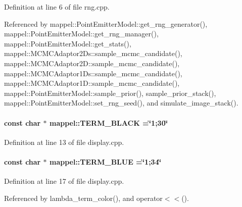 Definition at line 6 of file rng.\+cpp.



Referenced by mappel\+::\+Point\+Emitter\+Model\+::get\+\_\+rng\+\_\+generator(), mappel\+::\+Point\+Emitter\+Model\+::get\+\_\+rng\+\_\+manager(), mappel\+::\+Point\+Emitter\+Model\+::get\+\_\+stats(), mappel\+::\+M\+C\+M\+C\+Adaptor2\+Ds\+::sample\+\_\+mcmc\+\_\+candidate(), mappel\+::\+M\+C\+M\+C\+Adaptor2\+D\+::sample\+\_\+mcmc\+\_\+candidate(), mappel\+::\+M\+C\+M\+C\+Adaptor1\+Ds\+::sample\+\_\+mcmc\+\_\+candidate(), mappel\+::\+M\+C\+M\+C\+Adaptor1\+D\+::sample\+\_\+mcmc\+\_\+candidate(), mappel\+::\+Point\+Emitter\+Model\+::sample\+\_\+prior(), sample\+\_\+prior\+\_\+stack(), mappel\+::\+Point\+Emitter\+Model\+::set\+\_\+rng\+\_\+seed(), and simulate\+\_\+image\+\_\+stack().

\paragraph[{\texorpdfstring{T\+E\+R\+M\+\_\+\+B\+L\+A\+CK}{TERM_BLACK}}]{\setlength{\rightskip}{0pt plus 5cm}const char $\ast$ mappel\+::\+T\+E\+R\+M\+\_\+\+B\+L\+A\+CK =\char`\"{}1;30\char`\"{}}\hypertarget{namespacemappel_a448ca8ea08b3b9cdf522884ac004d901}{}\label{namespacemappel_a448ca8ea08b3b9cdf522884ac004d901}


Definition at line 13 of file display.\+cpp.

\paragraph[{\texorpdfstring{T\+E\+R\+M\+\_\+\+B\+L\+UE}{TERM_BLUE}}]{\setlength{\rightskip}{0pt plus 5cm}const char $\ast$ mappel\+::\+T\+E\+R\+M\+\_\+\+B\+L\+UE =\char`\"{}1;34\char`\"{}}\hypertarget{namespacemappel_a04365b9f87e9c572c79e2da4ff4a0378}{}\label{namespacemappel_a04365b9f87e9c572c79e2da4ff4a0378}


Definition at line 17 of file display.\+cpp.



Referenced by lambda\+\_\+term\+\_\+color(), and operator$<$$<$().

